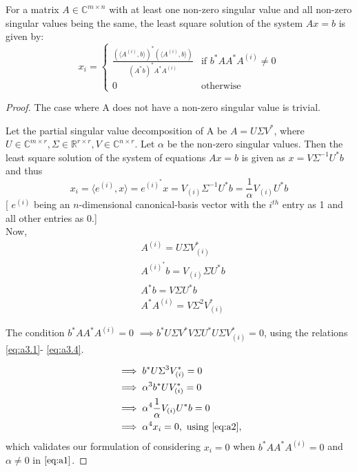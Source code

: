 \documentclass[10pt,a4paper]{amsart}
\begin{document}
\begin{theorem}\label{thm:direct_solver}
For a matrix $A \in \mathbb{C}^{m\times n}$ with at least one non-zero singular value and all non-zero singular values being the same, the least square solution of the system $Ax=b$ is given by: 
\begin{equation}
x_i =
\begin{cases}
\frac{(\langle A^{(i)}, b\rangle)^*(\langle A^{(i)}, b\rangle)}{(A^{*}b)^{*}A^{*}A^{(i)}} & \text{if } b^{*}AA^{*}A^{(i)} \neq 0 \\
0 & \text{otherwise}
\end{cases}
\label{eq:a1}
\end{equation}
\end{theorem}

\begin{proof}
The case where A does not have a non-zero singular value is trivial.

Let the partial singular value decomposition of A be $A=U\Sigma V^{*}$, where $U \in \mathbb{C}^{m\times r}, \Sigma \in \mathbb{R}^{r\times r}, V \in \mathbb{C}^{n\times r}$. Let $\alpha$ be the non-zero singular values. Then the least square solution of the system of equations $Ax=b$ is given as $x= V\Sigma ^{-1}U^{*}b$ and thus 
\begin{equation}
x_i= \langle e^{(i)},x\rangle=e^{(i)^*}x=V_{(i)}\Sigma ^{-1}U^{*}b=\frac{1}{\alpha}V_{(i)}U^{*}b
\label{eq:a2}
\end{equation}
[ $e^{(i)}$ being an $n$-dimensional canonical-basis vector with the $i^{th}$ entry as 1 and all other entries as 0.]\\

Now, \begin{align}
\label{eq:a3.1}
& A^{(i)}=U\Sigma V_{(i)}^{*}\\ 
\label{eq:a3.2}
 & A^{(i)^{*}}b=V_{(i)}\Sigma U^{*}b\\
 \label{eq:a3.3}
 & A^{*}b=V\Sigma U^{*}b\\
 \label{eq:a3.4}
 & A^{*}A^{(i)}=V \Sigma ^{2}V_{(i)}^{*}
\end{align}

The condition $b^{*}AA^{*}A^{(i)} = 0$ $ \implies b^{*}U\Sigma V^{*}V\Sigma U^{*}U\Sigma V_{(i)}^{*} =0$, using the relations \eqref{eq:a3.1}- \eqref{eq:a3.4}.

\begin{align*}
 & \implies b^{*}U\Sigma ^{3} V_{(i)}^{*} =0 \\
& \implies \alpha ^3 b^*UV_{(i)}^*=0 \\
& \implies \alpha ^4 \frac{1}{\alpha}V_{(i)}U^{*}b=0\\
& \implies \alpha^4 x_i = 0, \text{ using } \eqref{eq:a2},
\end{align*}
which validates our formulation of considering $x_i=0$ when $b^{*}AA^{*}A^{(i)} = 0$ and $\alpha \neq 0$ in $\eqref{eq:a1}$.


\end{proof}
\end{document}
